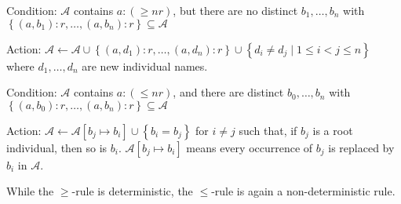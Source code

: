 \begin{mdframed}[frametitle= The $ \geq$-rule]
	Condition: $\mathcal{A}$ contains $a:( \geq nr)$, but there are no distinct
	$b_1, \ldots, b_n$ with $\left\{ (a,b_1):r, \ldots, (a,b_n):r \right\} \subseteq \mathcal{A}$

	Action: $\mathcal{A} \leftarrow \mathcal{A} \cup \left\{ (a,d_1):r, \ldots, (a,d_n):r \right\} \cup \left\{ d_i \neq d_j \mid 1 \leq i < j \leq n \right\}$
	where $d_1, \ldots, d_n$ are new individual names.
\end{mdframed}
\begin{mdframed}[frametitle= The $ \leq$-rule, nobreak = true]
	Condition: $\mathcal{A}$ contains $a:( \leq nr)$, and there are distinct
	$b_0, \ldots, b_n$ with $\left\{ (a,b_0):r, \ldots, (a,b_n):r \right\} \subseteq \mathcal{A}$

	Action: $\mathcal{A} \leftarrow \mathcal{A}[b_j \mapsto b_i] \cup \left\{ b_i = b_j \right\}$
	for $i \neq j$ such that, if $b_j$ is a root individual, then so is $b_i$.
	$\mathcal{A}[b_j \mapsto b_i]$ means every occurrence of $b_j$ is replaced by $b_i$ in $\mathcal{A}$.
\end{mdframed}
\begin{note}
	While the $ \geq$-rule is deterministic, the $ \leq$-rule is again a non-deterministic rule.
\end{note}

